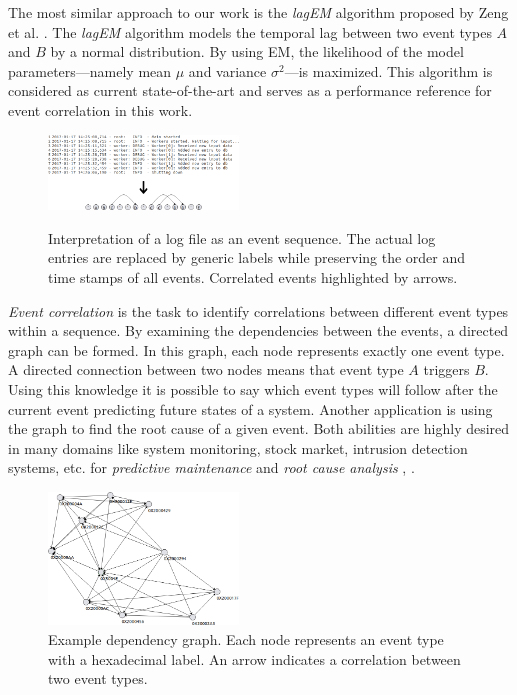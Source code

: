\documentclass[conference]{IEEEtran}
\theoremstyle{examplestyle}
\begin{document}
The most similar approach to our work is the \textit{lagEM} algorithm proposed by Zeng et al. \cite{Zeng2015}. The \textit{lagEM} algorithm models the temporal lag between two event types \(A\) and \(B\) by a normal distribution. By using \ac{EM}, the likelihood of the model parameters---namely mean \(\mu\) and variance \(\sigma^2\)---is maximized. This algorithm is considered as current state-of-the-art and serves as a performance reference for event correlation in this work.

\begin{figure}[!tb]
	\centering
	{
	\includegraphics[width=0.45\textwidth]{images/overview.png}}
	\caption{Interpretation of a log file as an event sequence. The actual log entries are replaced by generic labels while preserving the order and time stamps of all events. Correlated events highlighted  by arrows.}
	\label{fig:logToSequence}
\end{figure}


\textit{Event correlation} is the task to identify correlations between different event types within a sequence. By examining the dependencies between the events, a directed graph can be formed. In this graph, each node represents exactly one event type. A directed connection between two nodes means that event type \(A\) triggers \(B\). Using this knowledge it is possible to say which event types will follow after the current event predicting future states of a system. Another application is using the graph to find the root cause of a given event. Both abilities are highly desired in many domains like system monitoring, stock market, intrusion detection systems, etc. for \textit{predictive maintenance} and \textit{root cause analysis} \cite{Zeng2015}, \cite{Benferhat2008}.


\begin{figure}[!tb]
	\centering
	\includegraphics[width=0.45\textwidth]{images/dependency-graph}
	\caption{Example dependency graph. Each node represents an event type with a hexadecimal label. An arrow indicates a  correlation between two event types.}
	\label{fig:exampleDependencyGraph}
\end{figure}
\end{document}
